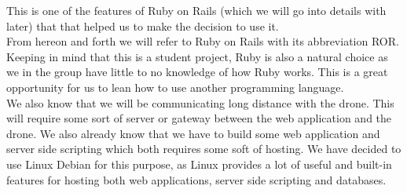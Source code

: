 This is one of the features of Ruby on Rails (which we will go into details with later) that that helped us to make the decision to use it. \\

From hereon and forth we will refer to Ruby on Rails with its abbreviation ROR. \\

Keeping in mind that this is a student project, Ruby is also a natural choice as we in the group have little to no knowledge of how Ruby works. 
This is a great opportunity for us to lean how to use another programming language. \\

We also know that we will be communicating long distance with the drone. 
This will require some sort of server or gateway between the web application and the drone.
We also already know that we have to build some web application and server side scripting which both requires some soft of hosting.
We have decided to use Linux Debian for this purpose, as Linux provides a lot of useful and built-in features for hosting both web applications, server side scripting and databases. 
